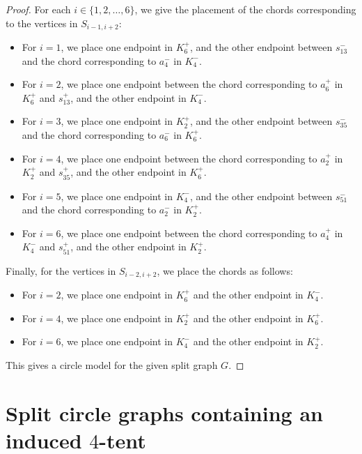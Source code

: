 \documentclass[12pt]{book}
\theoremstyle{plain}
\theoremstyle{remark}
\begin{document}
\begin{proof}
\vspace{1mm}
For each $i \in \{ 1, 2, \ldots, 6\}$, we give the placement of the chords corresponding to the vertices in $S_{i-1, i+2}$:
\begin{itemize}
	\item For $i = 1$, we place one endpoint in $K_6^+$, and the other endpoint between $s_{13}^-$ and the chord corresponding to $a_4^-$ in $K_4^-$. 
	\item For $i = 2$, we place one endpoint between the chord corresponding to $a_6^+$ in $K_6^+$ and $s_{13}^+$, and the other endpoint in $K_4^-$. 
	\item For $i = 3$, we place one endpoint in $K_2^+$, and the other endpoint between $s_{35}^-$ and the chord corresponding to $a_6^-$ in $K_6^+$. 
	\item For $i = 4$, we place one endpoint between the chord corresponding to $a_2^+$ in $K_2^+$ and $s_{35}^+$, and the other endpoint in $K_6^+$.
	\item For $i = 5$, we place one endpoint in $K_4^-$, and the other endpoint between $s_{51}^-$ and the chord corresponding to $a_2^-$ in $K_2^+$. 
	\item For $i = 6$, we place one endpoint between the chord corresponding to $a_4^+$ in $K_4^-$ and $s_{51}^+$, and the other endpoint in $K_2^+$.  
\end{itemize}

Finally, for the vertices in $S_{i-2,i+2}$, we place the chords as follows:
\begin{itemize}
	\item For $i=2$, we place one endpoint in $K_6^+$ and the other endpoint in $K_4^-$.
	\item For $i=4$, we place one endpoint in $K_2^+$ and the other endpoint in $K_6^+$.
	\item For $i=6$, we place one endpoint in $K_4^-$ and the other endpoint in $K_2^+$.
\end{itemize}

This gives a circle model for the given split graph $G$.
\end{proof}

\section{Split circle graphs containing an induced $4$-tent} \label{sec:circle3}
\end{document}
